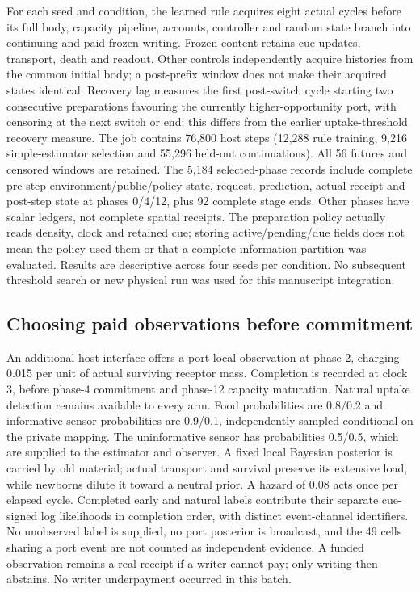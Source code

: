 For each seed and condition, the learned rule acquires eight actual cycles before its full body, capacity pipeline, accounts, controller and random state branch into continuing and paid-frozen writing. Frozen content retains cue updates, transport, death and readout. Other controls independently acquire histories from the common initial body; a post-prefix window does not make their acquired states identical. Recovery lag measures the first post-switch cycle starting two consecutive preparations favouring the currently higher-opportunity port, with censoring at the next switch or end; this differs from the earlier uptake-threshold recovery measure. The job contains 76,800 host steps (12,288 rule training, 9,216 simple-estimator selection and 55,296 held-out continuations). All 56 futures and censored windows are retained. The 5,184 selected-phase records include complete pre-step environment/public/policy state, request, prediction, actual receipt and post-step state at phases 0/4/12, plus 92 complete stage ends. Other phases have scalar ledgers, not complete spatial receipts. The preparation policy actually reads density, clock and retained cue; storing active/pending/due fields does not mean the policy used them or that a complete information partition was evaluated. Results are descriptive across four seeds per condition. No subsequent threshold search or new physical run was used for this manuscript integration.

\subsection*{Choosing paid observations before commitment}
An additional host interface offers a port-local observation at phase 2, charging 0.015 per unit of actual surviving receptor mass. Completion is recorded at clock 3, before phase-4 commitment and phase-12 capacity maturation. Natural uptake detection remains available to every arm. Food probabilities are 0.8/0.2 and informative-sensor probabilities are 0.9/0.1, independently sampled conditional on the private mapping. The uninformative sensor has probabilities 0.5/0.5, which are supplied to the estimator and observer. A fixed local Bayesian posterior is carried by old material; actual transport and survival preserve its extensive load, while newborns dilute it toward a neutral prior. A hazard of 0.08 acts once per elapsed cycle. Completed early and natural labels contribute their separate cue-signed log likelihoods in completion order, with distinct event-channel identifiers. No unobserved label is supplied, no port posterior is broadcast, and the 49 cells sharing a port event are not counted as independent evidence. A funded observation remains a real receipt if a writer cannot pay; only writing then abstains. No writer underpayment occurred in this batch.

